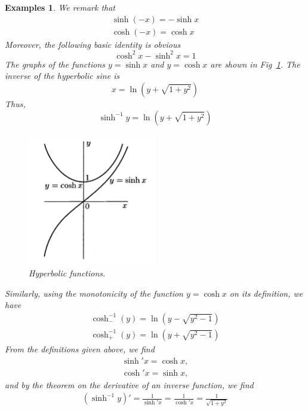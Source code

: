 \documentclass[a4paper,12pt]{article} %
\newtheorem{example}{Examples}
\begin{document}
\begin{example}
    We remark that 
    \[
        \begin{split}
            \sinh (-x) = -\sinh x \\
            \cosh (-x) =  \cosh x
        \end{split}
        \]
    Moreover, the following basic identity is obvious
    \[
        \cosh^2x - \sinh^2x = 1
        \]
    The graphs of the functions $y = \sinh x$ and $y = \cosh x$ are shown in 
    Fig~\ref{fig:hyps}. The inverse of the hyperbolic sine is 
    \[
        x = \ln (y + \sqrt{1+y^2})
        \]
    Thus, 
    \[
        \sinh^{-1} y = \ln(y + \sqrt{1+y^2})
        \]
    \graphicspath{
        {./Figs/}
    }
    \begin{figure}[htbp]
        \centering
        \includegraphics[width=0.5\textwidth]{hyps.png}
        \caption{Hyperbolic functions.}
        \label{fig:hyps}
    \end{figure}
    Similarly, using the monotonicity of the function $y = \cosh x$
    on its definition, we have 
    \[
        \begin{split}
            \cosh^{-1}_-(y) = \ln \left(y - \sqrt{y^2 - 1}\right)\\
            \cosh^{-1}_+(y) = \ln \left(y + \sqrt{y^2 - 1}\right)
        \end{split}
        \]
    From the definitions given above, we find 
    \[
        \begin{split}
            \sinh'x = \cosh x,\\
            \cosh'x = \sinh x,
        \end{split}
        \]
    and by the theorem on the derivative of an inverse function, we find
    \[
        \begin{split}
            \left(\sinh^{-1}y\right)' = \frac{1}{\sinh'x} = \frac{1}{\cosh'x} = \frac{1}{\sqrt{1+y^2}}\\

\end{split}\]
\end{example}
\end{document}

